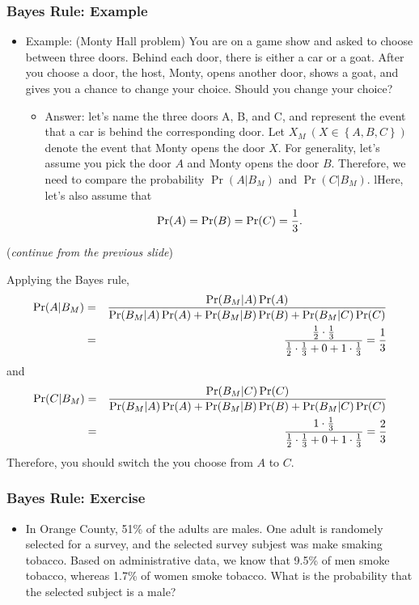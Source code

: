\documentclass[pdflatex, 12pt]{beamer}
\begin{document}
\begin{frame}
\frametitle{Bayes Rule: Example}
\begin{itemize}
\item Example: (Monty Hall problem) You are on a game show and asked to choose between three doors. Behind each door, there is either a car or a goat. After you choose a door, the host, Monty, opens another door, shows a goat, and gives you a chance to change your choice. Should you change your choice?
\vspace{0.4cm}
 \begin{itemize}
 \item Answer: let's name the three doors A, B, and C, and represent the event that a car is behind the corresponding door. Let $X_{M} \ (X \in \left\{A, B, C\right\})$ denote the event that Monty opens the door $X$. For generality, let's assume you pick the door $A$ and Monty opens the door $B$. Therefore, we need to compare the probability $\Pr(A|B_{M})$ and $\Pr(C|B_{M})$. lHere, let's also assume that
  \begin{equation}
  \Pr(A) = \Pr(B) = \Pr(C) = \frac{1}{3}. \notag
  \end{equation}  
 \end{itemize}
\end{itemize}
\end{frame}

\begin{frame}
(\emph{continue from the previous slide})

\vspace{0.4cm}
Applying the Bayes rule,
{\footnotesize
\begin{eqnarray}
\Pr(A|B_{M}) &=& \frac{\Pr(B_M|A)\Pr(A)}{\Pr(B_M|A)\Pr(A) + \Pr(B_M|B)\Pr(B) + \Pr(B_M|C)\Pr(C)} \notag \\
&=& \frac{\frac{1}{2} \cdot \frac{1}{3}}{\frac{1}{2} \cdot \frac{1}{3} + 0 + 1 \cdot \frac{1}{3}} = \frac{1}{3} \notag
\end{eqnarray}
}
and 
{\footnotesize
\begin{eqnarray}
\Pr(C|B_{M}) &=& \frac{\Pr(B_M|C)\Pr(C)}{\Pr(B_M|A)\Pr(A) + \Pr(B_M|B)\Pr(B) + \Pr(B_M|C)\Pr(C)} \notag \\
&=& \frac{1 \cdot \frac{1}{3}}{\frac{1}{2} \cdot \frac{1}{3} + 0 + 1 \cdot \frac{1}{3}} = \frac{2}{3} \notag
\end{eqnarray}
}
Therefore, you should switch the you choose from $A$ to $C$.
\end{frame}

\begin{frame}
\frametitle{Bayes Rule: Exercise}
\begin{itemize}
\item In Orange County, 51\% of the adults are males. One adult is randomely selected for a survey, and the selected survey subjest was make smaking tobacco. Based on administrative data, we know that 9.5\% of men smoke tobacco, whereas 1.7\% of women smoke tobacco. What is the probability that the selected subject is a male?
\end{itemize}
\end{frame}
\end{document}
